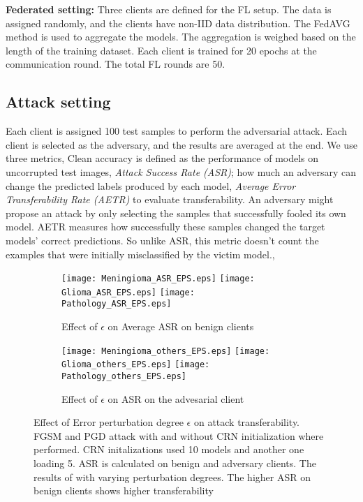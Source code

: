 \textbf{Federated setting:}
Three clients are defined for the FL setup. The data is assigned randomly, and the clients have non-IID data distribution.
The FedAVG method is used to aggregate the models. The aggregation is weighed based on the length of the training dataset. Each client is trained for 20 epochs at the communication round. The total FL rounds are 50.

\subsection{Attack setting}

Each client is assigned 100 test samples to perform the adversarial attack. Each client is selected as the adversary, and the results are averaged at the end. 
We use three metrics,
Clean accuracy is defined as the performance of models on uncorrupted test images, \textit{Attack Success Rate (ASR)}; how much an adversary can change the predicted labels produced by each model, \textit{Average Error Transferability Rate (AETR)} to evaluate transferability. An adversary might propose an attack by only selecting the samples that successfully fooled its own model. AETR measures how successfully these samples changed the target models' correct predictions. So unlike ASR, this metric doesn't count the examples that were initially misclassified by the victim model.\cite{papernot2017practical},

\begin{figure*}[h!]
     \centering
     \begin{subfigure}
         \centering
         \texttt{[image: Meningioma\_ASR\_EPS.eps]}
          \texttt{[image: Glioma\_ASR\_EPS.eps]}
           \texttt{[image: Pathology\_ASR\_EPS.eps]}
         \caption{Effect of $\epsilon$ on Average ASR on benign clients }
         \label{fig:AASR benign-EPS}
     \end{subfigure}
     \hfill
     \begin{subfigure}
          \centering
         \texttt{[image: Meningioma\_others\_EPS.eps]}
          \texttt{[image: Glioma\_others\_EPS.eps]}
           \texttt{[image: Pathology\_others\_EPS.eps]}
         \caption{Effect of $\epsilon$ on ASR on the advesarial client }
         \label{fig:AASR malignant-EPS}
     \end{subfigure}
     \hfill
        \caption{Effect of Error perturbation degree $\epsilon$ on attack transferability. FGSM and PGD attack with and without CRN initialization where performed. CRN initalizations used 10 models and another one loading 5.  ASR is calculated on benign and adversary clients. The results of with varying perturbation degrees. The higher ASR on benign clients shows higher transferability}
        \label{fig: epsilon graphs}
\end{figure*}

